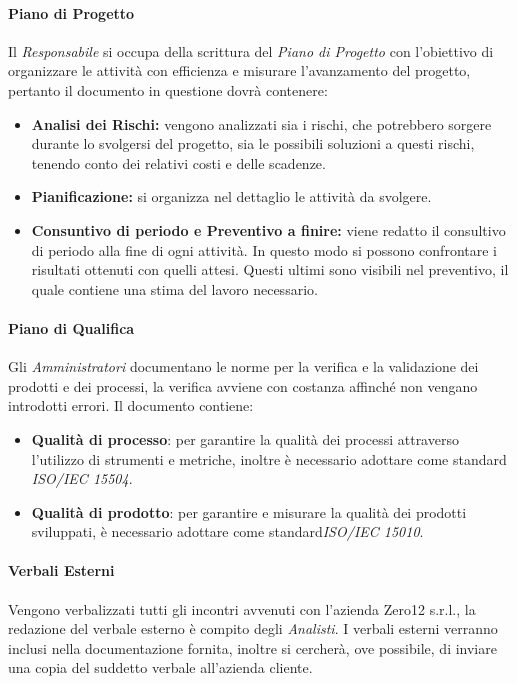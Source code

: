 \paragraph{Piano di Progetto}
Il \textit{Responsabile} si occupa della scrittura del \textit{Piano di Progetto} con l'obiettivo di organizzare le attività con efficienza e misurare l'avanzamento del progetto, pertanto il documento in questione dovrà contenere:
\begin{itemize}
	\item \textbf{Analisi dei Rischi:} vengono analizzati sia i rischi, che potrebbero sorgere durante lo svolgersi del progetto, sia le possibili soluzioni a questi rischi, tenendo conto dei relativi costi e delle scadenze.
	\item \textbf{Pianificazione:} si organizza nel dettaglio le attività da svolgere.
	\item \textbf{Consuntivo di periodo e Preventivo a finire:} viene redatto il consultivo di periodo alla fine di ogni attività. In questo modo si possono confrontare i risultati ottenuti con quelli attesi. Questi ultimi sono visibili nel preventivo, il quale contiene una stima del lavoro necessario.
\end{itemize}

\paragraph{Piano di Qualifica}
Gli \textit{Amministratori} documentano le norme per la verifica e la validazione dei prodotti e dei processi, la verifica avviene con costanza affinché non vengano introdotti errori. Il documento contiene:
\begin{itemize}
	\item \textbf{Qualità di processo}: per garantire la qualità dei processi attraverso l'utilizzo di strumenti e metriche, inoltre è necessario adottare come standard \textit{ISO/IEC 15504}.
	\item \textbf{Qualità di prodotto}: per garantire e misurare la qualità dei prodotti sviluppati, è necessario adottare come standard\textit{ISO/IEC 15010}.
\end{itemize}

\paragraph{Verbali Esterni}
Vengono verbalizzati tutti gli incontri avvenuti con l'azienda Zero12 s.r.l., la redazione del verbale esterno è compito degli \textit{Analisti}. I verbali esterni verranno inclusi nella documentazione fornita, inoltre si cercherà, ove possibile, di inviare una copia del suddetto verbale all'azienda cliente.

